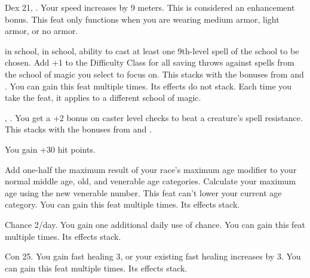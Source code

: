 {}
{Dex 21, .}
{Your speed increases by 9 meters. This is considered an enhancement bonus.}
{}{This feat only functions when you are wearing medium armor, light armor, or no armor.}

{}
{ in school,  in school, ability to cast at least one 9th-level spell of the school to be chosen.}
{Add +1 to the Difficulty Class for all saving throws against spells from the school of magic you select to focus on. This stacks with the bonuses from  and .}
{}{You can gain this feat multiple times. Its effects do not stack. Each time you take the feat, it applies to a different school of magic.}

{, .}
{You get a +2 bonus on caster level checks to beat a creature's spell resistance. This stacks with the bonuses from  and .}

{}
{You gain +30 hit points.}

{}{}
{Add one-half the maximum result of your race's maximum age modifier to your normal middle age, old, and venerable age categories. Calculate your maximum age using the new venerable number. This feat can't lower your current age category.}
{}{You can gain this feat multiple times. Its effects stack.}

{}
{Chance 2/day.}
{You gain one additional daily use of chance.}
{}{You can gain this feat multiple times. Its effects stack.}


{}
{Con 25.}
{You gain fast healing 3, or your existing fast healing increases by 3.}
{}{You can gain this feat multiple times. Its effects stack.}





